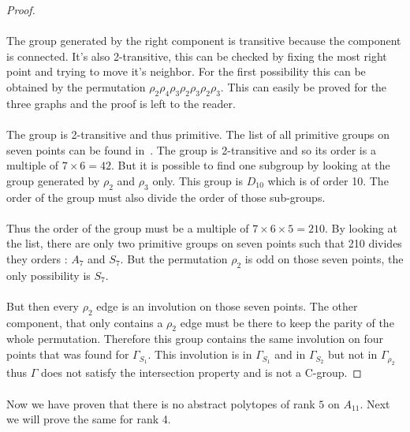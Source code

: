 \begin{proof}
  \paragraph{}
  The group generated by the right component is transitive because the component is connected. It's also 2-transitive, this can be checked by fixing the most right point and trying to move it's neighbor. For the first possibility this can be obtained by the permutation $\rho_2 \rho_4 \rho_3 \rho_2 \rho_3 \rho_2 \rho_3$. This can easily be proved for the three graphs and the proof is left to the reader.

  \paragraph{}
  The group is 2-transitive and thus primitive. The list of all primitive groups on seven points can be found in~\cite{buekenhout1996list}. The group is 2-transitive and so its order is a multiple of $7 \times 6 = 42$. But it is possible to find one subgroup by looking at the group generated by $\rho_2$ and $\rho_3$ only. This group is $D_{10}$ which is of order 10. The order of the group must also divide the order of those sub-groups.

  \paragraph{}
  Thus the order of the group must be a multiple of $7 \times 6 \times 5 = 210$. By looking at the list, there are only two primitive groups on seven points such that 210 divides they orders : $A_7$ and $S_7$. But the permutation $\rho_2$ is odd on those seven points, the only possibility is $S_7$.

  \paragraph{}
  But then every $\rho_2$ edge is an involution on those seven points. The other component, that only contains a $\rho_2$ edge must be there to keep the parity of the whole permutation. Therefore this group contains the same involution on four points that was found for $\Gamma_{S_1}$. This involution is in $\Gamma_{S_1}$ and in $\Gamma_{S_2}$ but not in $\Gamma_{\rho_2}$ thus $\Gamma$ does not satisfy the intersection property and is not a C-group.

\end{proof}

\paragraph{}
Now we have proven that there is no abstract polytopes of rank $5$ on $A_{11}$. Next we will prove the same for rank 4.
